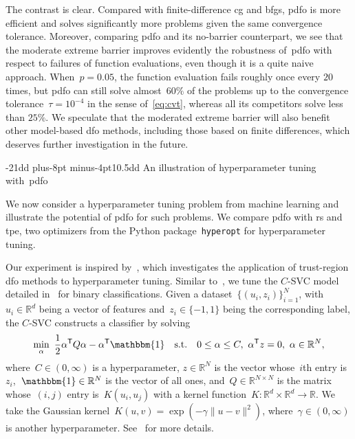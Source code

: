 \documentclass[
    smallextended,  %
    final,          %
]{svjour3}
\makeatletter
\newcommand{\trs}{{\scriptstyle{\mathsf{T}}}}
\newcommand{\ones}{\mathbbm{1}}
\newcommand{\R}{\mathbb{R}}
\newcommand{\st}{\text{s.t.}}
\def\subsection{\@startsection{subsection}{2}{\z@}%
    {-21dd plus-8pt minus-4pt}{10.5dd}
     {\normalsize\bfseries}}
\makeatother
\begin{document}
The contrast is clear.
Compared with finite-difference \gls{cg} and \gls{bfgs}, \gls{pdfo} is
more efficient and solves significantly more problems given the same convergence tolerance.
Moreover, comparing \gls{pdfo} and its no-barrier counterpart, we see that the moderate extreme barrier
improves evidently the robustness of~\gls{pdfo} with respect to failures of function evaluations,
even though it is a quite naive approach.
When~$p = 0.05$, the function evaluation fails roughly once every $20$ times,
but \gls{pdfo} can still solve almost~$60\%$ of the problems up to the convergence
tolerance~$\tau = 10^{-4}$ in the sense of~\eqref{eq:cvt}, whereas all its competitors solve less than $25\%$.
We speculate that the moderated extreme barrier will also benefit other model-based \gls{dfo} methods,
including those based on finite differences, which deserves further investigation in the future.


\subsection{An illustration of hyperparameter tuning with~\gls{pdfo}}
\label{ssec:hypertune}

We now consider a hyperparameter tuning problem from machine learning and illustrate the potential
of \gls{pdfo} for such problems.
We compare \gls{pdfo} with \gls{rs} and \gls{tpe}, two optimizers
from the Python package~\texttt{hyperopt} for hyperparameter tuning.

Our experiment is inspired by~\cite[\S~5.3]{Ghanbari_Scheinberg_2017}, which investigates the
application of trust-region \gls{dfo} methods to hyperparameter tuning.
Similar to~\mbox{\cite[\S~5.3]{Ghanbari_Scheinberg_2017}},
we tune the $C$-SVC model detailed in~\cite[\S~2.1]{Chang_Lin_2011} for binary classifications.
Given a dataset~$\{(u_i,z_i)\}_{i=1}^N$, with~$u_i \in \R^d$ being a vector of features
and~$z_i \in \{-1,1\}$ being the corresponding label,
the $C$-SVC constructs a classifier by solving
\begin{equation}
    \label{eq:svc}
        \min_{\alpha}  ~\frac{1}{2} \alpha^\trs Q \alpha - \alpha^\trs \ones
        \quad \st \quad 0 \leq \alpha \leq C, ~ \alpha^\trs z = 0, ~\alpha \in\R^{N},
\end{equation}
where~$C\in(0,\infty)$ is a hyperparameter, $z\in\R^{N}$ is the vector whose~$i$th entry is~$z_i$,~$\ones\in\R^N$
is the vector of all ones, and~$Q\in\R^{N\times N}$ is the matrix whose~$(i,j)$ entry is~$K(u_i,u_j)$
with a kernel function~$K\mathrel{:} \R^{d}\times\R^{d} \to \R$.
We take the Gaussian kernel~$K(u,v) = \exp(-\gamma\|u-v\|^2)$, where~$\gamma \in (0,\infty)$ is
another hyperparameter.
See~\cite[\S~2.1]{Chang_Lin_2011} for more details.
\end{document}
